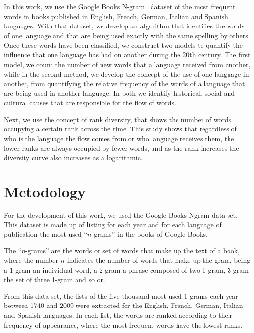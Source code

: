 \documentclass[10pt,letterpaper]{article} %
\begin{document}
In this work, we use the Google Books N-gram~\cite{ngramv} dataset of the most
frequent words in books published in  English, French, German, Italian and
Spanish languages.  With that dataset,  we develop an algorithm that identifies
the words of one language  and that are being used exactly with the same 
spelling by others. Once these words
have been classified, we construct two models to quantify  the influence that
one language has had on another during the 20th century. The first model, we
count the number of new words that a language received from another, while in
the second method, we develop the concept of the use of one language in
another,  from quantifying the relative frequency of  the words of a language
that are being used in another language. In both we identify historical, social
and cultural causes that are responsible for the flow of words.
 
Next, we use the concept of rank diversity,  that shows the number of words
occupying a certain rank across the time. This study shows that  regardless of
who is the language the flow comes from or who language receives them,  the
lower ranks are always occupied by fewer  words, and as the rank increases the
diversity curve also increases as a logarithmic. 
 

\section*{Metodology} %


For the development of this work,  we used the Google Books Ngram data set.
This dataset is made up of listing for each year and for each language of
publication the most used ``$n$-grams'' in the books of Google Books. 

The ``$n$-grams'' are the words or set of words that make up the text of a
book, where the number $n$ indicates the number of words that make up the gram,
being a 1-gram an individual word, a 2-gram a phrase composed of two 1-gram,
3-gram the set of three 1-gram and so on.

From this data set, the lists of the five thousand most used 1-grams each year
between 1740 and 2009 were extracted for the English, French, German, Italian
and Spanish languages. In each list, the words are ranked according to their
frequency of appearance, where the most frequent words have the lowest ranks.
\end{document}
